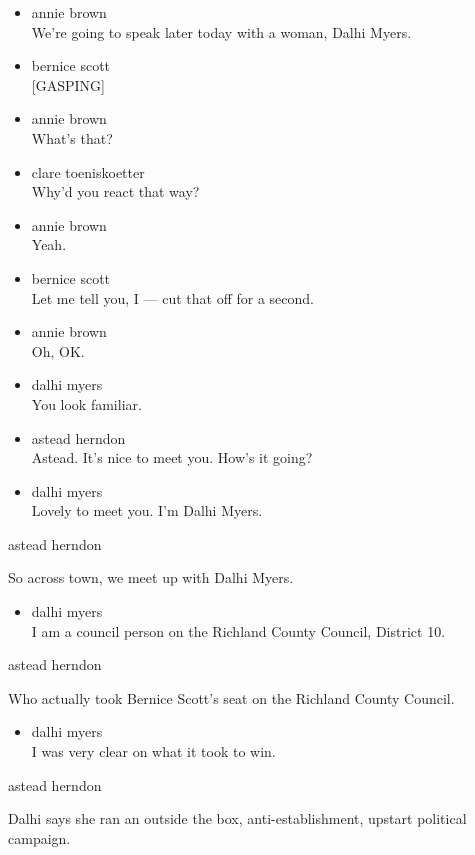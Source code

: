 \begin{itemize}
\item
  annie brown\\
  We're going to speak later today with a woman, Dalhi Myers.
\item
  bernice scott\\
  {[}GASPING{]}
\item
  annie brown\\
  What's that?
\item
  clare toeniskoetter\\
  Why'd you react that way?
\item
  annie brown\\
  Yeah.
\item
  bernice scott\\
  Let me tell you, I --- cut that off for a second.
\item
  annie brown\\
  Oh, OK.
\item
  dalhi myers\\
  You look familiar.
\item
  astead herndon\\
  Astead. It's nice to meet you. How's it going?
\item
  dalhi myers\\
  Lovely to meet you. I'm Dalhi Myers.
\end{itemize}

astead herndon

So across town, we meet up with Dalhi Myers.

\begin{itemize}
\tightlist
\item
  dalhi myers\\
  I am a council person on the Richland County Council, District 10.
\end{itemize}

astead herndon

Who actually took Bernice Scott's seat on the Richland County Council.

\begin{itemize}
\tightlist
\item
  dalhi myers\\
  I was very clear on what it took to win.
\end{itemize}

astead herndon

Dalhi says she ran an outside the box, anti-establishment, upstart
political campaign.

